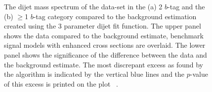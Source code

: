\begin{figure}[!htb]
  \begin{center}
    \captionsetup[subfigure]{aboveskip=0pt,justification=centering}
  \end{center}
  \caption[The dijet mass (\mjj{}) spectrum of the \summer{} data-set in the (a) 2 $b$-tag and the (b) $\geq$1 $b$-tag category
    compared to the background estimation created using the 3 parameter dijet fit function.
    The most discrepant excess as found by the \bh{} algorithm and associated the \mbox{$p$-value} are shown.]
          {The dijet mass spectrum of the  \summer{} data-set in the (a) 2 $b$-tag and the (b) $\geq$1 $b$-tag category
            compared to the background estimation created using the 3 parameter dijet fit function.
            The upper panel shows the data compared to the background estimate,
            benchmark signal models with enhanced cross sections are overlaid.
            The lower panel shows the significance of the difference between the data and the background estimate.
            The most discrepant excess as found by the \bh{} algorithm is indicated by the vertical blue lines and the \mbox{$p$-value} of this excess is printed on the plot
            ~\cite{dibjet-ichep_conf}.
          }
  \label{fig:bkg-summer_searchPhase}
\end{figure}

